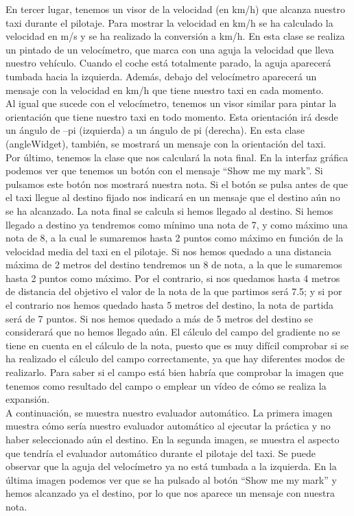 En tercer lugar, tenemos un visor de la velocidad (en km/h) que alcanza nuestro taxi durante el pilotaje. Para mostrar la velocidad en km/h se ha calculado la velocidad en m/s y se ha realizado la conversión a km/h. En esta clase se realiza un pintado de un velocímetro, que marca con una aguja la velocidad que lleva nuestro vehículo. Cuando el coche está totalmente parado, la aguja aparecerá tumbada hacia la izquierda. Además, debajo del velocímetro aparecerá un mensaje con la velocidad en km/h que tiene nuestro taxi en cada momento.\\

Al igual que sucede con el velocímetro, tenemos un visor similar para pintar la orientación que tiene nuestro taxi en todo momento. Esta orientación irá desde un ángulo de –pi (izquierda) a un ángulo de pi (derecha). En esta clase (angleWidget), también, se mostrará un mensaje con la orientación del taxi.\\

Por último, tenemos la clase que nos calculará la nota final. En la interfaz gráfica podemos ver que tenemos un botón con el mensaje ``Show me my mark''. Si pulsamos este botón nos mostrará nuestra nota. Si el botón se pulsa antes de que el taxi llegue al destino fijado nos indicará en un mensaje que el destino aún no se ha alcanzado. La nota final se calcula si hemos llegado al destino. Si hemos llegado a destino ya tendremos como mínimo una nota de 7, y como máximo una nota de 8, a la cual le sumaremos hasta 2 puntos como máximo en función de la velocidad media del taxi en el pilotaje. Si nos hemos quedado a una distancia máxima de 2 metros del destino tendremos un 8 de nota, a la que le sumaremos hasta 2 puntos como máximo. Por el contrario, si nos quedamos hasta 4 metros de distancia del objetivo el valor de la nota de la que partimos será 7.5; y si por el contrario nos hemos quedado hasta 5 metros del destino, la nota de partida será de 7 puntos. Si nos hemos quedado a más de 5 metros del destino se considerará que no hemos llegado aún. El cálculo del campo del gradiente no se tiene en cuenta en el cálculo de la nota, puesto que es muy difícil comprobar si se ha realizado el cálculo del campo correctamente, ya que hay diferentes modos de realizarlo. Para saber si el campo está bien habría que comprobar la imagen que tenemos como resultado del campo o emplear un vídeo de cómo se realiza la expansión.\\

A continuación, se muestra nuestro evaluador automático. La primera imagen muestra cómo sería nuestro evaluador automático al ejecutar la práctica y no haber seleccionado aún el destino. En la segunda imagen, se muestra el aspecto que tendría el evaluador automático durante el pilotaje del taxi. Se puede observar que la aguja del velocímetro ya no está tumbada a la izquierda. En la última imagen podemos ver que se ha pulsado al botón “Show me my mark” y hemos alcanzado ya el destino, por lo que nos aparece un mensaje con nuestra nota.\\



